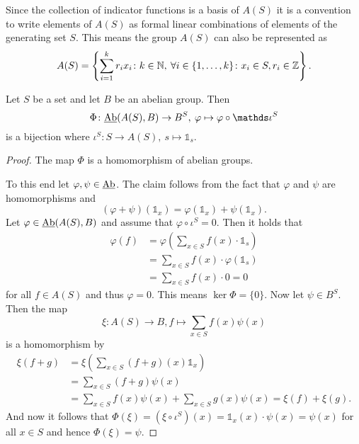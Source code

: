 Since the collection of indicator functions is a basis of $A(S)$ it is a convention to write elements of $A(S)$ as formal linear combinations of elements of the generating set $S$. This means the group $A(S)$ can also be represented as
\begin{equation*}
  A(S) = \left\{\sum\limits_{i=1}^k r_i x_i\colon k\in \mathbb{N}, \: \forall i \in \{1, \ldots, k\}\colon x_i \in S, r_i \in \mathbb{Z}\right\}.
\end{equation*}

\begin{thm}\label{thm:isoab}
  Let $S$ be a set and let $B$ be an abelian group. Then \[\Phi\colon \underline{\rm Ab}(A(S), B) \to B^S, \: \varphi \mapsto\varphi \circ \mathds\iota^S\] is a bijection where $\iota^S\colon S \to A(S), \: s \mapsto \mathds{1}_s$.
\end{thm}

\begin{proof}
  The map $\Phi$ is a homomorphism of abelian groups.

  To this end let $\varphi, \psi \in \underline{\rm Ab}$.
  The claim follows from the fact that $\varphi$ and $\psi$ are homomorphisms and \[(\varphi + \psi)(\mathds{1}_x) = \varphi(\mathds{1}_x) + \psi(\mathds{1}_x).\]
  Let $\varphi \in \underline{\rm Ab}(A(S), B)$ and assume that $\varphi \circ \iota^S = 0$. Then it holds that
  \begin{align*}
    \varphi(f) &= \varphi\left(\sum\limits_{x \in S}f(x) \cdot \mathds{1}_s\right) \\
    &= \sum\limits_{x \in S} f(x) \cdot \varphi(\mathds{1}_s) \\
    &= \sum\limits_{x \in S} f(x) \cdot 0 = 0
  \end{align*}
  for all $f \in A(S)$ and thus $\varphi = 0$. This means $\ker \Phi = \{0\}$.
  Now let $\psi \in B^S$. Then the map \[\xi\colon A(S) \to B, f \mapsto \sum\limits_{x \in S} f(x) \psi(x) \] is a homomorphism by
  \begin{align*}
    \xi(f + g) &= \xi\left(\sum\limits_{x \in S} (f+g)(x) \mathds{1}_x\right) \\
    &= \sum\limits_{x \in S}(f+g)\psi(x) \\
    &= \sum\limits_{x \in S} f(x)\psi(x) + \sum\limits_{x \in S}g(x)\psi(x) = \xi(f) + \xi(g).
  \end{align*}
  And now it follows that $\Phi(\xi) = (\xi \circ \iota^S)(x) = \mathds{1}_x(x) \cdot \psi(x) = \psi(x)$ for all $x \in S$ and hence $\Phi(\xi) = \psi$.
\end{proof}

